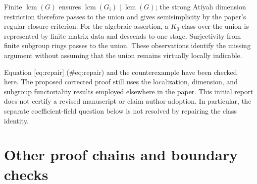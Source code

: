 \documentclass[10pt]{article}
\begin{document}
Finite \(\operatorname{lcm}(G)\) ensures \(\operatorname{lcm}(G_i)\mid\operatorname{lcm}(G)\); the strong Atiyah dimension restriction therefore passes to the union and gives semisimplicity by the paper’s regular-closure criterion. For the algebraic assertion, a \(K_0\)-class over the union is represented by finite matrix data and descends to one stage. Surjectivity from finite subgroup rings passes to the union. These observations identify the missing argument without assuming that the union remains virtually locally indicable.\par
Equation [eq:repair] (\#eq:repair) and the counterexample have been checked here. The proposed corrected proof still uses the localization, dimension, and subgroup functoriality results employed elsewhere in the paper. This initial report does not certify a revised manuscript or claim author adoption. In particular, the separate coefficient-field question below is not resolved by repairing the class identity.\par
\section*{Other proof chains and boundary checks}
\end{document}

